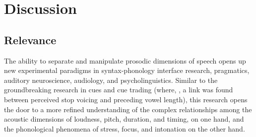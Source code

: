 \chapter{Discussion}

% 

\section{Relevance}
The ability to separate and manipulate prosodic dimensions of speech opens up new experimental paradigms in syntax-phonology interface research, pragmatics, auditory neuroscience, audiology, and psycholinguistics.  Similar to the groundbreaking research in cues and cue trading (where, \eg, a link was found between perceived stop voicing and preceding vowel length), this research opens the door to a more refined understanding of the complex relationships among the acoustic dimensions of loudness, pitch, duration, and timing, on one hand, and the phonological phenomena of stress, focus, and intonation on the other hand.

